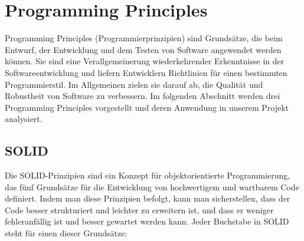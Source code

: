\chapter{Programming Principles}
Programming Principles (Programmierprinzipien) sind Grundsätze, die beim Entwurf, der Entwicklung und dem Testen von Software angewendet werden können. Sie sind eine Verallgemeinerung wiederkehrender Erkenntnisse in der Softwareentwicklung und liefern Entwicklern Richtlinien für einen bestimmten Programmierstil.
Im Allgemeinen zielen sie darauf ab, die Qualität und Robustheit von Software zu verbessern. Im folgenden Abschnitt werden drei Programming Principles vorgestellt und deren Anwendung in unserem Projekt analysiert. 

\section{SOLID}
Die SOLID-Prinzipien sind ein Konzept für objektorientierte Programmierung, das fünf Grundsätze für die Entwicklung von hochwertigem und wartbarem Code definiert. Indem man diese Prinzipien befolgt, kann man sicherstellen, dass der Code besser strukturiert und leichter zu erweitern ist, und dass er weniger fehleranfällig ist und besser gewartet werden kann. Jeder Buchstabe in SOLID steht für einen dieser Grundsätze:

